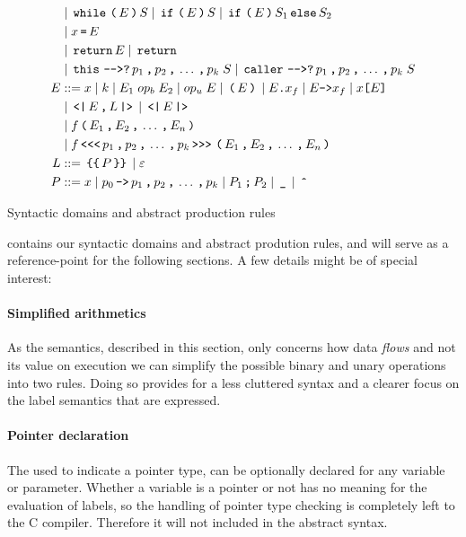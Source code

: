 \begin{table}[p]
\begin{align*}
              & \gp \tk{while} \tk ( E \tk ) S \gp \tk{if} \tk ( E \tk ) S \gp \tk{if} \tk ( E \tk ) S_1 \tk{else} S_2 \\
              & \gp x \tk = E \\
              & \gp \tk{return} E \gp \tk{return} \\
              & \gp \tk{this} \tk{-{}->?} p_1 \tk , p_2 \tk , \dots \tk , p_k \; S \gp \tk{caller} \tk{-{}->?} p_1 \tk , p_2 \tk , \dots \tk , p_k \; S \\
    E         & ::= x \gp k \gp E_1 \; op_b \; E_2 \gp op_u \; E \gp \tk ( E \tk ) \gp E \texttt{.} x_f \gp E \texttt{->} x_f \gp x \texttt{[} E \texttt{]} \\
              & \gp \tk{<|} E \tk , L \tk{|>} \gp \tk{<|} E \tk{|>} \\
              & \gp f \tk ( E_1 \tk , E_2 \tk , \dots \tk , E_n \tk ) \\
              & \gp f \tk{<{}<{}<} p_1 \tk , p_2 \tk , \dots \tk , p_k \tk{>{}>{}>} \tk ( E_1 \tk , E_2 \tk , \dots \tk , E_n \tk ) \\
    L         & ::= \tk{\{\{} P \tk{\}\}} \gp \varepsilon \\
    P         & ::= x \gp p_0 \tk{->} p_1 \tk , p_2 \tk , \dots \tk , p_k \gp P_1 \tk ; P_2 \gp \tk \_ \gp \tk{\^{}}
  \end{align*}
  \caption{Syntactic domains and abstract production rules}
  \label{ctif:rules}
\end{table}

 contains our syntactic domains and abstract prodution rules, and will serve as a reference-point for the following sections.
A few details might be of special interest:

\paragraph{Simplified arithmetics}
As the semantics, described in this section, only concerns how data \textit{flows} and not its value on execution we can simplify the possible binary and unary operations into two rules.
Doing so provides for a less cluttered syntax and a clearer focus on the label semantics that are expressed.

\paragraph{Pointer declaration}
The \tk{*} used to indicate a pointer type, can be optionally declared for any variable or parameter.
Whether a variable is a pointer or not has no meaning for the evaluation of labels, so the handling of pointer type checking is completely left to the C compiler.
Therefore it will not included in the abstract syntax.

